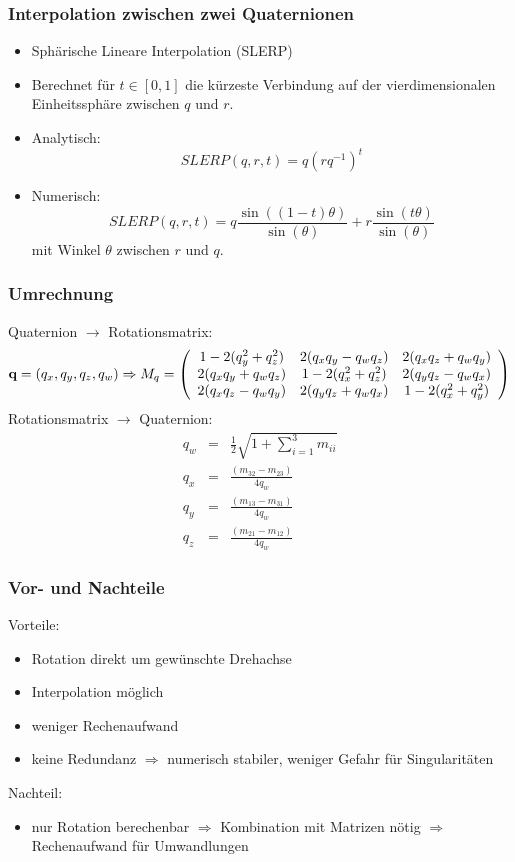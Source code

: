 \subsubsection{Interpolation zwischen zwei Quaternionen}
\begin{itemize}
\item Sphärische Lineare Interpolation (SLERP)
\item Berechnet für $t \in [0,1]$ die kürzeste Verbindung auf der vierdimensionalen Einheitssphäre zwischen $q$ und $r$.
\item Analytisch: $$SLERP(q,r,t) = q(rq^{-1})^t$$
\item Numerisch: $$SLERP(q,r,t) = q \frac{\sin((1-t)\theta)}{\sin(\theta)} + r \frac{\sin(t \theta)}{\sin(\theta)}$$ mit Winkel $\theta$ zwischen $r$ und $q$.
\end{itemize}

\subsubsection{Umrechnung}
Quaternion $\to$ Rotationsmatrix: $$\textbf{q} = (q_x,q_y,q_z,q_w) \Rightarrow M_q = \left( \begin{array}{ccc} 1-2(q_y^2 + q_z^2) & 2(q_xq_y - q_wq_z) & 2(q_xq_z + q_wq_y) \\ 2(q_xq_y + q_wq_z) & 1-2(q_x^2 + q_z^2) & 2(q_yq_z - q_wq_x) \\ 2(q_xq_z - q_wq_y) & 2(q_yq_z + q_wq_x) & 1-2(q_x^2 + q_y^2) \end{array} \right)$$
Rotationsmatrix $\to$ Quaternion:
\begin{eqnarray*}
q_w &=& \frac{1}{2} \sqrt{1 + \sum\limits_{i=1}^3 m_{ii}} \\ q_x &=& \frac{(m_{32} - m_{23})}{4q_w} \\ q_y &=& \frac{(m_{13} - m_{31})}{4q_w} \\ q_z &=& \frac{(m_{21} - m_{12})}{4q_w}
\end{eqnarray*}

\subsubsection{Vor- und Nachteile}
Vorteile:
\begin{itemize}
\item Rotation direkt um gewünschte Drehachse
\item Interpolation möglich
\item weniger Rechenaufwand
\item keine Redundanz $\Rightarrow$ numerisch stabiler, weniger Gefahr für Singularitäten
\end{itemize}
Nachteil:
\begin{itemize}
\item nur Rotation berechenbar $\Rightarrow$ Kombination mit Matrizen nötig $\Rightarrow$ Rechenaufwand für Umwandlungen
\end{itemize}

